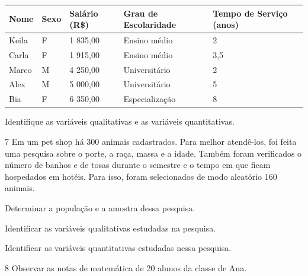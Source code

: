 \begin{longtable}[]{@{}lllll@{}}
\toprule
\textbf{Nome} & \textbf{Sexo} & \textbf{Salário (R\$)} & \textbf{Grau de
Escolaridade} & \textbf{Tempo de Serviço (anos)}\tabularnewline
\midrule
\endhead
Keila & F & 1 835,00 & Ensino médio & 2\tabularnewline
Carla & F & 1 915,00 & Ensino médio & 3,5\tabularnewline
Marco & M & 4 250,00 & Universitário & 2\tabularnewline
Alex & M & 5 000,00 & Universitário & 5\tabularnewline
Bia & F & 6 350,00 & Especialização & 8\tabularnewline
\bottomrule
\end{longtable}

Identifique as variáveis qualitativas e as variáveis quantitativas.


\num{7} Em um pet shop há 300 animais cadastrados. Para melhor atendê-los,
foi feita uma pesquisa sobre o porte, a raça, massa e a idade. Também
foram verificados o número de banhos e de tosas durante o semestre e o
tempo em que ficam hospedados em hotéis. Para isso, foram selecionados
de modo aleatório 160 animais.

\begin{escolha}
\item
  Determinar a população e a amostra dessa pesquisa.
\item{}
\item\reduline{\mbox{}\hfill}
\item\reduline{\mbox{}\hfill}

\item
  Identificar as variáveis qualitativas estudadas na pesquisa.
\item{}
\item\reduline{\mbox{}\hfill}
\item\reduline{\mbox{}\hfill}

\item
  Identificar as variáveis quantitativas estudadas nessa pesquisa.
\item{}
\item\reduline{\mbox{}\hfill}
\item\reduline{\mbox{}\hfill}
\end{escolha}

\pagebreak
\num{8} Observar as notas de matemática de 20 alunos da classe de Ana.

